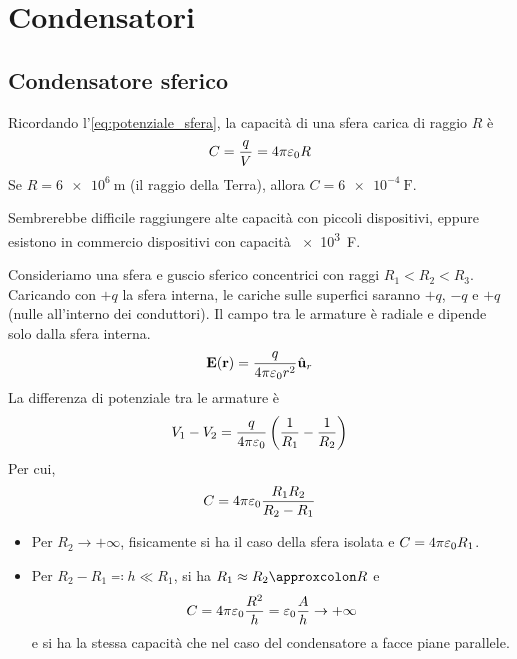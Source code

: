 \section{Condensatori}

\subsection{Condensatore sferico}


Ricordando l'\cref{eq:potenziale_sfera}, la capacità di una sfera carica di raggio $R$ è
\begin{equation}
    C = \frac{q}{V} = 4\pi\varepsilon_0 R
\end{equation}
Se $R = \qty{6e6}{\metre}$ (il raggio della Terra), allora $C = \qty{6e-4}{\farad}$.

Sembrerebbe difficile raggiungere alte capacità con piccoli dispositivi, eppure esistono in commercio dispositivi con capacità \qty{e3}{\farad}.

Consideriamo una sfera e guscio sferico concentrici con raggi $R_1 < R_2 < R_3$.
Caricando con $+q$ la sfera interna, le cariche sulle superfici saranno $+q$, $-q$ e $+q$ (nulle all'interno dei conduttori).
Il campo tra le armature è radiale e dipende solo dalla sfera interna.
\begin{equation}
    \mathbf{E}(\mathbf{r}) = \frac{q}{4\pi\varepsilon_0 r^2} \hat{\mathbf{u}}_{r}
\end{equation}
La differenza di potenziale tra le armature è
\begin{equation}
    V_1 - V_2 = \frac{q}{4\pi\varepsilon_0} \left( \frac{1}{R_1} - \frac{1}{R_2} \right)
\end{equation}
Per cui,
\begin{equation}
    C = 4\pi\varepsilon_0 \frac{R_1 R_2}{R_2 - R_1}
\end{equation}
\begin{itemize}
    \item Per $R_2 \to +\infty$, fisicamente si ha il caso della sfera isolata e $C = 4\pi\varepsilon_0 R_1$.
    \item Per $R_2 - R_1 \eqcolon h \ll R_1$, si ha $R_1 \approx R_2 \approxcolon R$ e
    \begin{equation}
        C = 4\pi\varepsilon_0 \frac{R^2}{h} = \varepsilon_0 \frac{A}{h} \to +\infty
    \end{equation}
    e si ha la stessa capacità che nel caso del condensatore a facce piane parallele.
\end{itemize}

